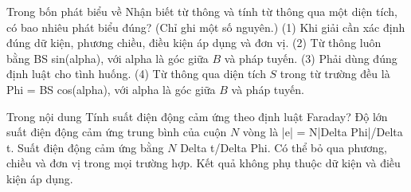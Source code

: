 \begin{ex}
Trong bốn phát biểu về Nhận biết từ thông và tính từ thông qua một diện tích, có bao nhiêu phát biểu đúng? (Chỉ ghi một số nguyên.) (1) Khi giải cần xác định đúng dữ kiện, phương chiều, điều kiện áp dụng và đơn vị. (2) Từ thông luôn bằng BS sin(alpha), với alpha là góc giữa $B$ và pháp tuyến. (3) Phải dùng đúng định luật cho tình huống. (4) Từ thông qua diện tích $S$ trong từ trường đều là Phi = BS cos(alpha), với alpha là góc giữa $B$ và pháp tuyến.
\end{ex}

\begin{ex}
Trong nội dung Tính suất điện động cảm ứng theo định luật Faraday?
\choice
{\True Độ lớn suất điện động cảm ứng trung bình của cuộn $N$ vòng là |e| = N|Delta Phi|/Delta t.}
{Suất điện động cảm ứng bằng $N$ Delta t/Delta Phi.}
{Có thể bỏ qua phương, chiều và đơn vị trong mọi trường hợp.}
{Kết quả không phụ thuộc dữ kiện và điều kiện áp dụng.}
\end{ex}

